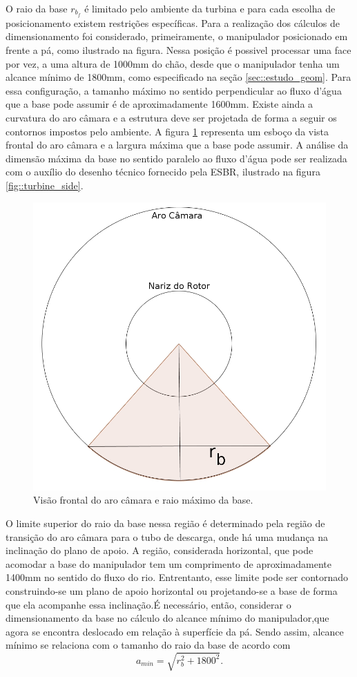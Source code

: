 O raio da base $r_{b_f}$ é limitado pelo ambiente da turbina e para cada escolha
de posicionamento existem restrições específicas. 
Para a realização dos cálculos de dimensionamento foi considerado,
primeiramente, o manipulador posicionado em frente a pá, como ilustrado na
figura. %
Nessa posição é possivel processar uma face por
vez, a uma altura de 1000mm do chão, desde que o manipulador tenha um alcance
mínimo de 1800mm, como especificado na seção \ref{sec::estudo_geom}. Para essa
configuração, a tamanho máximo no sentido perpendicular ao fluxo d'água que
a base pode assumir é de aproximadamente 1600mm. Existe ainda a curvatura do aro
câmara e a estrutura deve ser projetada de forma a seguir os
contornos impostos pelo ambiente.
A figura \ref{fig::base_aro_frente} 
representa um esboço da vista frontal do aro câmara e a largura máxima que a
base pode assumir. A análise da dimensão máxima da base no sentido paralelo ao
fluxo d'água pode ser realizada com o auxílio do desenho técnico fornecido pela
ESBR, ilustrado na figura \ref{fig::turbine_side}.

\begin{figure}[h!]
\centering
	\includegraphics[width=0.9\columnwidth]{figs/base/base_aro_frente.jpg}
	\caption{Visão frontal do aro câmara e raio máximo da base.}
	\label{fig::base_aro_frente}
\end{figure}

O limite superior do raio da base nessa
região é determinado pela região de transição do aro câmara para o tubo de
descarga, onde há uma mudança na inclinação do plano de apoio. A região,
considerada horizontal, que pode acomodar a base do manipulador tem um
comprimento de aproximadamente 1400mm no sentido do fluxo do rio.
Entrentanto, esse limite pode ser contornado construindo-se um plano de apoio
horizontal ou projetando-se a base de forma que ela acompanhe essa
inclinação.É necessário, então, considerar o dimensionamento da base no
cálculo do alcance mínimo do manipulador,que agora se encontra deslocado em
relação à superfície da pá. Sendo assim, alcance mínimo se relaciona com o tamanho do raio da base de 
acordo com $$a_{min}=\sqrt{r_b^2+1800^2}.$$

